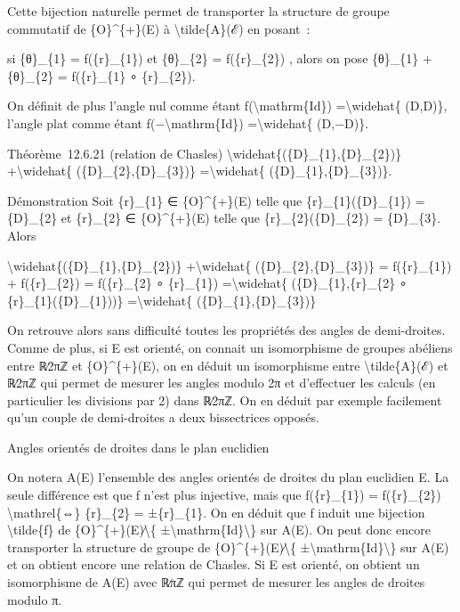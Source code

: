 \documentclass[]{article}
\begin{document}
Cette bijection naturelle permet de transporter la structure de groupe
commutatif de \{O\}\^{}\{+\}(E) à \textbackslash{}tilde\{A\}(ℰ) en
posant~:

si \{θ\}\_\{1\} = f(\{r\}\_\{1\}) et \{θ\}\_\{2\} = f(\{r\}\_\{2\}) ,
alors on pose \{θ\}\_\{1\} + \{θ\}\_\{2\} = f(\{r\}\_\{1\} ∘
\{r\}\_\{2\}).

On définit de plus l'angle nul comme étant
f(\textbackslash{}mathrm\{Id\}) =\textbackslash{}widehat\{ (D,D)\},
l'angle plat comme étant f(−\textbackslash{}mathrm\{Id\})
=\textbackslash{}widehat\{ (D,−D)\}.

Théorème~12.6.21 (relation de Chasles)
\textbackslash{}widehat\{(\{D\}\_\{1\},\{D\}\_\{2\})\}
+\textbackslash{}widehat\{ (\{D\}\_\{2\},\{D\}\_\{3\})\}
=\textbackslash{}widehat\{ (\{D\}\_\{1\},\{D\}\_\{3\})\}.

Démonstration Soit \{r\}\_\{1\} ∈ \{O\}\^{}\{+\}(E) telle que
\{r\}\_\{1\}(\{D\}\_\{1\}) = \{D\}\_\{2\} et \{r\}\_\{2\} ∈
\{O\}\^{}\{+\}(E) telle que \{r\}\_\{2\}(\{D\}\_\{2\}) = \{D\}\_\{3\}.
Alors

\textbackslash{}widehat\{(\{D\}\_\{1\},\{D\}\_\{2\})\}
+\textbackslash{}widehat\{ (\{D\}\_\{2\},\{D\}\_\{3\})\} =
f(\{r\}\_\{1\}) + f(\{r\}\_\{2\}) = f(\{r\}\_\{2\} ∘ \{r\}\_\{1\})
=\textbackslash{}widehat\{ (\{D\}\_\{1\},\{r\}\_\{2\} ∘
\{r\}\_\{1\}(\{D\}\_\{1\}))\} =\textbackslash{}widehat\{
(\{D\}\_\{1\},\{D\}\_\{3\})\}

On retrouve alors sans difficulté toutes les propriétés des angles de
demi-droites. Comme de plus, si E est orienté, on connait un
isomorphisme de groupes abéliens entre ℝ∕2πℤ et \{O\}\^{}\{+\}(E), on en
déduit un isomorphisme entre \textbackslash{}tilde\{A\}(ℰ) et ℝ∕2πℤ qui
permet de mesurer les angles modulo 2π et d'effectuer les calculs (en
particulier les divisions par 2) dans ℝ∕2πℤ. On en déduit par exemple
facilement qu'un couple de demi-droites a deux bissectrices opposés.

Angles orientés de droites dans le plan euclidien

On notera A(E) l'ensemble des angles orientés de droites du plan
euclidien E. La seule différence est que f n'est plus injective, mais
que f(\{r\}\_\{1\}) = f(\{r\}\_\{2\}) \textbackslash{}mathrel\{⇔\}
\{r\}\_\{2\} = ±\{r\}\_\{1\}. On en déduit que f induit une bijection
\textbackslash{}tilde\{f\} de \{O\}\^{}\{+\}(E)∕\textbackslash{}\{
±\textbackslash{}mathrm\{Id\}\textbackslash{}\} sur A(E). On peut donc
encore transporter la structure de groupe de
\{O\}\^{}\{+\}(E)∕\textbackslash{}\{
±\textbackslash{}mathrm\{Id\}\textbackslash{}\} sur A(E) et on obtient
encore une relation de Chasles. Si E est orienté, on obtient un
isomorphisme de A(E) avec ℝ∕πℤ qui permet de mesurer les angles de
droites modulo π.
\end{document}
